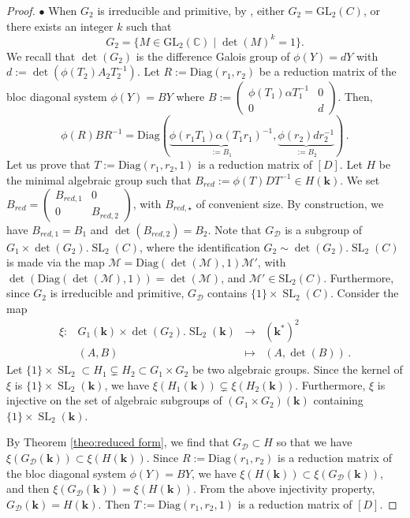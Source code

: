 \documentclass[a4paper,11pt]{amsart}
\newcommand{\SL}{\operatorname{SL}}
\newcommand{\GL}{\operatorname{GL}}
\newcommand{\Gdiag}{G_{\mathcal{D}}}
\def\k{\mathbf{k}}
\def\GL{\mathrm{GL}}
\begin{document}
\begin{proof}
$\bullet$  When $G_2$ is irreducible and primitive,  by  \cite[Section 4.4]{hendriks1998algorithm},  either  $G_2=\mathrm{GL}_2 (C)$, or there exists an integer $k$ such that 
$$
G_2 = \lbrace M\in\GL_2\left(\mathbb{C}\right) \mid \det(M)^{k}=1 \rbrace .
$$
We recall that $\det(G_2)$ is the difference Galois group of $\phi(Y)=dY$ with $d:=\det \left(\phi(T_2)A_2 T_2^{-1}\right)$.  
Let $R:=\mathrm{Diag}(r_1,r_2)$ be a reduction matrix of  the bloc diagonal system
 $\phi (Y)=BY$ where $B:=\begin{pmatrix}
\phi(T_1)\alpha T_1^{-1}&0\\ 
0 &d
\end{pmatrix}$.  
Then,  
$$
\phi(R)BR^{-1} = \mathrm{Diag}(\underbrace{\phi(r_1T_1)\alpha (T_1r_1)^{-1}}_{:=B_1}, \underbrace{\phi(r_2)d r_2^{-1}}_{:=B_2})\, .
$$
Let us prove that  $T:=\mathrm{Diag}(r_1,r_2,1)$ is a reduction matrix of $[D]$. Let $ H$ be the minimal algebraic group such that $B_{red}:=\phi(T)D T^{-1}\in H(\k)$. We set $B_{red}=\begin{pmatrix}
B_{red,1} & 0 \\ 0 & B_{red,2}
\end{pmatrix}$, with  $B_{red,\star}$ of convenient size. By construction, we have $B_{red,1} = B_1$ and $\det(B_{red,2}) = B_2$.
Note that $\Gdiag$ is a subgroup of  $G_1\times \det(G_2)  .\SL_2(C)$, where the identification $G_2\sim \det(G_2)  .\SL_2(C)$ is made via the map $\mathscr{M}= \mathrm{Diag}(\det(\mathscr{M}),1)\mathscr{M}'$, with $\det(\mathrm{Diag}(\det(\mathscr{M}),1))=\det(\mathscr{M})$, and $\mathscr{M}'\in \mathrm{SL}_2(C)$.   
Furthermore, since  $G_2$ is irreducible and primitive,  $\Gdiag$ contains $\{1\}\times \SL_2(C)$.  Consider the  map 
$$
\begin{array}{rccl}
\xi :  &   G_1 (\k) \times  \det(G_2). \SL_2 (\k) & \rightarrow & (\k^{*})^2 \\
     & (A,B) & \mapsto & (A,\det(B)) \, .
\end{array}
$$
 Let $ \{1\}\times \SL_2\subset H_1\subsetneq H_2\subset G_1\times G_2$ be two algebraic groups.   Since the kernel of $\xi$ is $ \{1\}\times \SL_2(\k)$,  we have $\xi(H_1(\k))\subsetneq \xi(H_2(\k))$.   Furthermore,  $\xi$ is injective on the set of  algebraic subgroups of  $(G_1\times G_2)(\k)$  containing $ \{1\}\times \SL_2(\k)$. \par 
By  Theorem \ref{theo:reduced form},  we find that $\Gdiag\subset H$ so that we have $\xi(\Gdiag(\k))\subset \xi(H(\k))$.  Since $R:=\mathrm{Diag}(r_1,r_2)$ is  a reduction matrix of  the bloc diagonal system
 $\phi (Y)=BY$, we have 
  $\xi(H(\k))\subset \xi(\Gdiag(\k))$,   and then $\xi(\Gdiag(\k))= \xi(H(\k))$.
From the above injectivity property,   $\Gdiag(\k)=H(\k)$. 
Then $T:=\mathrm{Diag}(r_1,r_2,1)$ is a reduction matrix of $[D]$.
\end{proof} 
\end{document}

